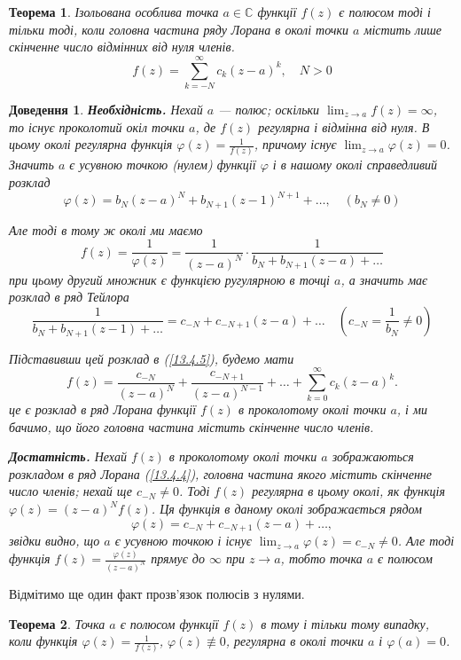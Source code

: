 \documentclass[12pt,fleqn]{article}
\theoremstyle{theorem}
\newtheorem{thm}{Теорема}[section]
\theoremstyle{proof}
\newtheorem*{dov}{Доведення}
\numberwithin{figure}{section}
\numberwithin{equation}{section}
\begin{document}
\begin{thm}\label{13.4.1}
Ізольована особлива точка $a\in\mathbb{C}$ функції $f(z)$ є полюсом тоді і тільки тоді, коли головна частина ряду Лорана в околі точки $a$ містить лише скінченне число відмінних від нуля членів.
\begin{equation}\label{13.4.4}
  f(z)=\sum_{k=-N}^{\infty}c_k(z-a)^k, \quad N>0
\end{equation}
\end{thm}
\begin{dov}
\textbf{Необхідність.} Нехай $a$ --- полюс; оскільки $\lim_{z \to a}f(z)=\infty$, то існує проколотий окіл точки $a$, де $f(z)$ регулярна і відмінна від нуля. В цьому околі регулярна функція $\varphi(z)=\frac{1}{f(z)}$, причому існує $\lim_{z \to a}\varphi(z)=0$. Значить $a$ є усувною точкою (нулем) функції $\varphi$ і в нашому околі справедливий розклад
$$\varphi(z)=b_N(z-a)^N+b_{N+1}(z-1)^{N+1}+\dots, \quad (b_N\neq 0) $$

Але тоді в тому ж околі ми маємо 
\begin{equation}\label{13.4.5}
  f(z)=\frac{1}{\varphi (z)}=\frac{1}{(z-a)^N}\cdot\frac{1}{b_N+b_{N+1}(z-a)+\dots}
\end{equation}
при цьому другий множник є функцією ругулярною в точці $a$, а значить має розклад в ряд Тейлора
$$\frac{1}{b_N+b_{N+1}(z-1)+\dots}=c_{-N}+c_{-N+1}(z-a)+\dots \quad (c_{-N}=\frac{1}{b_N}\neq 0)$$

Підставивши цей розклад в (\ref{13.4.5}), будемо мати
$$f(z)=\frac{c_{-N}}{(z-a)^N}+\frac{c_{-N+1}}{(z-a)^{N-1}}+\dots +\sum_{k=0}^{\infty}c_k(z-a)^k.$$
це є розклад в ряд Лорана функції $f(z)$ в проколотому околі точки $a$, і ми бачимо, що його головна частина містить скінченне число членів.

\textbf{Достатність.} Нехай $f(z)$ в проколотому околі точки $a$ зображаються розкладом в ряд Лорана (\ref{13.4.4}), головна частина якого містить скінченне число членів; нехай ще $c_{-N}\neq 0$. Тоді $f(z)$ регулярна в цьому околі, як функція $\varphi(z)=(z-a)^Nf(z)$. Ця функція в даному околі зображається рядом
$$\varphi(z)=c_{-N}+c_{-N+1}(z-a)+\dots,$$
звідки видно, що $a$ є усувною точкою і існує $\lim_{z \to a}\varphi(z)=c_{-N}\neq 0$. Але тоді функція $f(z)=\frac{\varphi (z)}{(z-a)^N}$ прямує до $\infty$ при $z \to a$, тобто точка $a$ є полюсом
\end{dov}

Відмітимо ще один факт прозв'язок полюсів з нулями.

\begin{thm}\label{thm.13.4.1}
  Точка $a$ є полюсом функції $f(z)$ в тому і тільки тому випадку, коли функція $\varphi(z)=\frac{1}{f(z)}$, $\varphi(z) \not\equiv 0$, регулярна в околі точки $a$ і $\varphi(a)=0$.
\end{thm}
\end{document}

